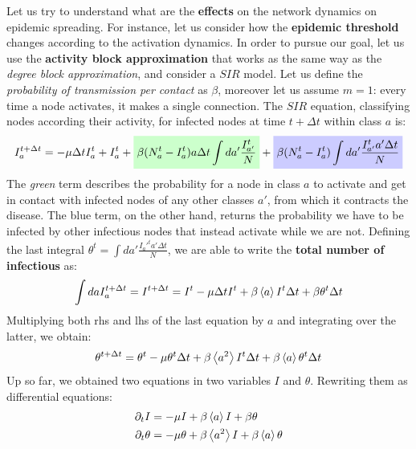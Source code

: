 \documentclass[../main/main.tex]{subfiles}
\begin{document}
Let us try to understand what are the \textbf{effects} on the network dynamics on epidemic spreading. For instance, let us consider how the \textbf{epidemic threshold} changes according to the activation dynamics.
In order to pursue our goal, let us use the \textbf{activity block approximation} that works as the same way as the \textit{degree block approximation}, and consider a $SIR$ model.
Let us define the \textit{probability of transmission per contact} as $\beta$, moreover let us assume $m=1$: every time a node activates, it makes a single connection. The $SIR$ equation, classifying nodes according their activity, for infected nodes at time $t + \Delta t$ within class $a$ is:
\begin{equation}
   I_a^{t+\Delta t} = -\mu \Delta t I^t_a + I^t_a + \mathcolorbox{green!20}{\beta(N_a^t - I_a^t) a \Delta t \int da' \frac{I_{a'}^t}{N} } +  \mathcolorbox{blue!20}{\beta (N_a^t - I_a^t)\int da' \frac{I_{a'}^t a' \Delta  t}{N}}
\end{equation}
The \textit{green} term describes the probability for a node in class $a$ to activate and get in contact with infected nodes of any other classes $a'$, from which it contracts the disease. The blue term, on the other hand, returns the probability we have to be infected by other infectious nodes that instead activate while we are not.
Defining the last integral $\theta^t = \int da' \frac{I_a'^t a' \Delta  t}{N} $, we are able to write the \textbf{total number of infectious} as:
\begin{equation}
    \int da I_a^{t + \Delta t} = I^{t + \Delta t} = I^t - \mu \Delta t I^t + \beta \expval{a} I^t \Delta t + \beta \theta^t \Delta t
\end{equation}
Multiplying both rhs and lhs of the last equation by $a$ and integrating over the latter, we obtain:
\begin{equation}
    \theta^{t + \Delta t} = \theta^{t} - \mu \theta^t \Delta t + \beta \expval{a^2} I^t \Delta t + \beta \expval{a} \theta^t \Delta t
\end{equation}
Up so far, we obtained two equations in two variables $I$ and $\theta$. Rewriting them as differential equations:
\begin{subequations}
\begin{align}
    \partial_t I &= -\mu I + \beta \expval{a} I + \beta \theta\\
    \partial_t \theta &= -\mu \theta + \beta \expval{a^2}I + \beta \expval{a}\theta
\end{align}
\end{subequations}
\end{document}
